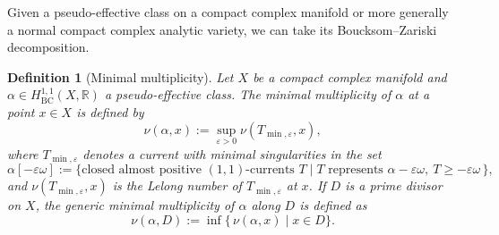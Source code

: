 \documentclass[12pt]{amsart}
\numberwithin{equation}{section}
\theoremstyle{definition}
\theoremstyle{plain}
\newtheorem{definition}  [theorem]     {Definition}
\newtheorem*{thm A*}{Theorem A}
\newtheorem*{thm B*}{Theorem B}
\newtheorem*{thm C*}{Theorem C}
\newtheorem*{thm D*}{Theorem D}
\theoremstyle{definition}
\renewcommand{\1}{\mathds{1}}
\renewcommand{\>}{\rightarrow}
\begin{document}
Given a pseudo-effective class on a compact complex manifold or more generally a normal compact complex analytic variety, we can take its Boucksom--Zariski decomposition. 
\begin{definition}[Minimal multiplicity]
Let $X$ be a compact complex manifold and $\alpha \in H^{1,1}_{\mathrm{BC}}(X, \mathbb{R})$ a pseudo-effective class. The \emph{minimal multiplicity} of $\alpha$ at a point $x \in X$ is defined by
\[
\nu(\alpha, x) := \sup_{\varepsilon > 0} \nu\!\left(T_{\min,\varepsilon}, x\right),
\]
where $T_{\min,\varepsilon}$ denotes a current with minimal singularities in the set
\[
\alpha[-\varepsilon \omega] := \{\text{closed almost positive } (1,1)\text{-currents } T \mid T \text{ represents } \alpha - \varepsilon \omega,\ T \ge -\varepsilon \omega \,\},
\]and $\nu(T_{\min, \varepsilon},x)$ is the Lelong number of $T_{\min,\varepsilon}$ at $x$. 
If $D$ is a prime divisor on $X$, the \emph{generic minimal multiplicity} of $\alpha$ along $D$ is defined as
\[
\nu(\alpha, D) := \inf \{\, \nu(\alpha, x) \mid x \in D\}.
\]
\end{definition}
\end{document}
